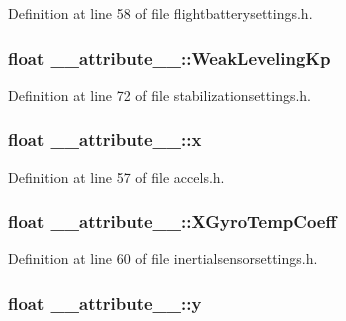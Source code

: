 \-Definition at line 58 of file flightbatterysettings.\-h.

\hypertarget{struct____attribute_____a9fb67d0e7e3ab37116840bbfbf6a09e1}{
\subsubsection[{\-Weak\-Leveling\-Kp}]{\setlength{\rightskip}{0pt plus 5cm}float {\bf \-\_\-\-\_\-attribute\-\_\-\-\_\-\-::\-Weak\-Leveling\-Kp}}}\label{struct____attribute_____a9fb67d0e7e3ab37116840bbfbf6a09e1}


\-Definition at line 72 of file stabilizationsettings.\-h.

\hypertarget{struct____attribute_____a65823868c215c44bb8a17253d81372f8}{
\subsubsection[{x}]{\setlength{\rightskip}{0pt plus 5cm}float {\bf \-\_\-\-\_\-attribute\-\_\-\-\_\-\-::x}}}\label{struct____attribute_____a65823868c215c44bb8a17253d81372f8}


\-Definition at line 57 of file accels.\-h.

\hypertarget{struct____attribute_____af91ec6288697b3ec56eabd2ebf855c62}{
\subsubsection[{\-X\-Gyro\-Temp\-Coeff}]{\setlength{\rightskip}{0pt plus 5cm}float {\bf \-\_\-\-\_\-attribute\-\_\-\-\_\-\-::\-X\-Gyro\-Temp\-Coeff}}}\label{struct____attribute_____af91ec6288697b3ec56eabd2ebf855c62}


\-Definition at line 60 of file inertialsensorsettings.\-h.

\hypertarget{struct____attribute_____afe44c79e22a712d1364d3d7cd86150eb}{
\subsubsection[{y}]{\setlength{\rightskip}{0pt plus 5cm}float {\bf \-\_\-\-\_\-attribute\-\_\-\-\_\-\-::y}}}\label{struct____attribute_____afe44c79e22a712d1364d3d7cd86150eb}


